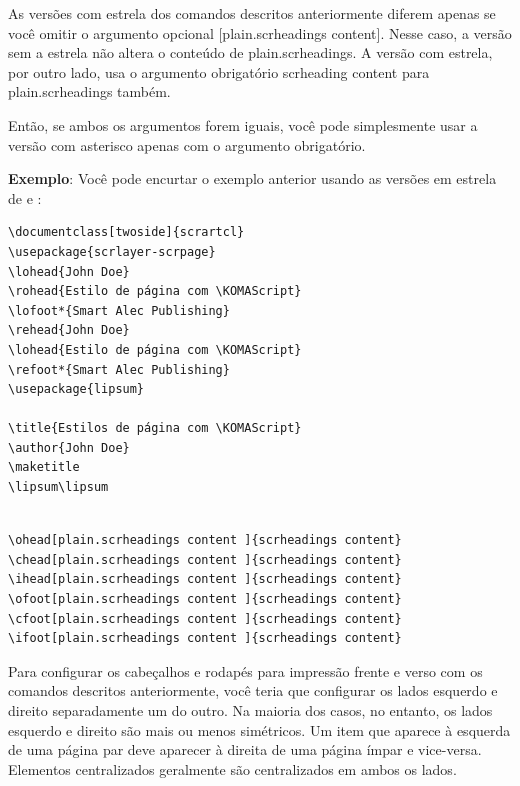 As versões com estrela dos comandos descritos anteriormente diferem apenas se você omitir o argumento opcional [plain.scrheadings content]. Nesse caso, a versão sem a estrela não altera o conteúdo de plain.scrheadings. A versão com estrela, por outro lado, usa o argumento obrigatório scrheading content para plain.scrheadings também.

Então, se ambos os argumentos forem iguais, você pode simplesmente usar a versão com asterisco apenas com o argumento obrigatório.

\textbf{Exemplo}: Você pode encurtar o exemplo anterior usando as versões em estrela de  e :
\begin{verbatim}
\documentclass[twoside]{scrartcl}
\usepackage{scrlayer-scrpage}
\lohead{John Doe}
\rohead{Estilo de página com \KOMAScript}
\lofoot*{Smart Alec Publishing}
\rehead{John Doe}
\lohead{Estilo de página com \KOMAScript}
\refoot*{Smart Alec Publishing}
\usepackage{lipsum}

\title{Estilos de página com \KOMAScript}
\author{John Doe}
\maketitle
\lipsum\lipsum
 
\end{verbatim}

\begin{verbatim}
\ohead[plain.scrheadings content ]{scrheadings content}
\chead[plain.scrheadings content ]{scrheadings content}
\ihead[plain.scrheadings content ]{scrheadings content}
\ofoot[plain.scrheadings content ]{scrheadings content}
\cfoot[plain.scrheadings content ]{scrheadings content}
\ifoot[plain.scrheadings content ]{scrheadings content} 
\end{verbatim}

Para configurar os cabeçalhos e rodapés para impressão frente e verso com os comandos descritos anteriormente, você teria que configurar os lados esquerdo e direito separadamente um do outro. Na maioria dos casos, no entanto, os lados esquerdo e direito são mais ou menos simétricos. Um item que aparece à esquerda de uma página par deve aparecer à direita de uma página ímpar e vice-versa. Elementos centralizados geralmente são centralizados em ambos os lados.

